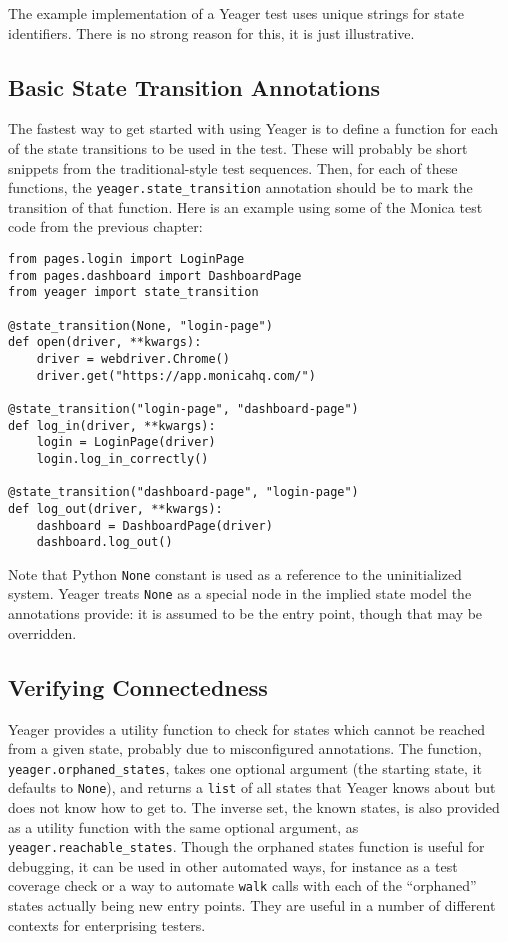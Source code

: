 The example implementation of a Yeager test uses unique strings for state identifiers. There is no strong reason for this, it is just illustrative.

\subsection{Basic State Transition Annotations}
The fastest way to get started with using Yeager is to define a function for each of the state transitions to be used in the test. These will probably be short snippets from the traditional-style test sequences. Then, for each of these functions, the \texttt{yeager.state\_transition} annotation should be to mark the transition of that function. Here is an example using some of the Monica test code from the previous chapter:

\begin{verbatim}
from pages.login import LoginPage
from pages.dashboard import DashboardPage
from yeager import state_transition

@state_transition(None, "login-page")
def open(driver, **kwargs):
    driver = webdriver.Chrome()
    driver.get("https://app.monicahq.com/")

@state_transition("login-page", "dashboard-page")
def log_in(driver, **kwargs):
    login = LoginPage(driver)
    login.log_in_correctly()

@state_transition("dashboard-page", "login-page")
def log_out(driver, **kwargs):
    dashboard = DashboardPage(driver)
    dashboard.log_out()
\end{verbatim}

Note that Python \texttt{None} constant is used as a reference to the uninitialized system. Yeager treats \texttt{None} as a special node in the implied state model the annotations provide: it is assumed to be the entry point, though that may be overridden.

\subsection{Verifying Connectedness}
Yeager provides a utility function to check for states which cannot be reached from a given state, probably due to misconfigured annotations. The function, \texttt{yeager.orphaned\_states}, takes one optional argument (the starting state, it defaults to \texttt{None}), and returns a \texttt{list} of all states that Yeager knows about but does not know how to get to. The inverse set, the known states, is also provided as a utility function with the same optional argument, as \texttt{yeager.reachable\_states}. Though the orphaned states function is useful for debugging, it can be used in other automated ways, for instance as a test coverage check or a way to automate \texttt{walk} calls with each of the ``orphaned'' states actually being new entry points. They are useful in a number of different contexts for enterprising testers.

